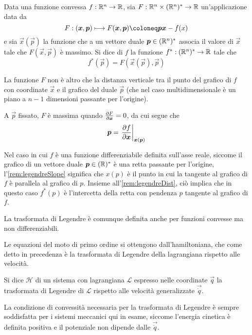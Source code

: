 \begin{definition}
  Data una funzione convessa $f:\mathbb{R}^{n}\to \mathbb{R}$, sia $F: \mathbb{R}^{n} \times (\mathbb{R}^{n})^* \to \mathbb{R}$ un'applicazione data da 
  \begin{equation}
    F: (\vec{x},\vec{p}) \longmapsto  F(\vec{x},\vec{p}) \defeq \vec{p}\vec{x} - f(x)
  \end{equation} 
  e sia $\vec{x}(\vec{p})$ la funzione che a un vettore duale $\boldsymbol{p} \in (\mathbb{R}^{n})^*$ associa il valore di $\vec{x}$ tale che $F(\vec{x},\vec{p})$ è massimo. Si dice  di $f$ la funzione $f^*:(\mathbb{R}^{n})^* \to \mathbb{R}$ tale che \begin{equation}
  f^*(\vec{p}) = F(\vec{x}(\vec{p}), \vec{p})
  \end{equation} 
\end{definition}
\begin{remark} \label{rem:legendreDist}
  La funzione $F$ non è altro che la distanza verticale tra il punto del grafico di $f$ con coordinate $\vec{x}$ e il grafico del duale $\vec{p}$ (che nel caso multidimensionale è un piano a $n-1$ dimensioni passante per l'origine). 
\end{remark}
\begin{remark} \label{rem:legendreSlope}
  A $\vec{p}$ fissato, $F$ è massima quando $\pdv{F}{\boldsymbol{x}}=0$, da cui segue che \begin{equation}
    \vec{p}=\eval{\pdv{f}{\vec{x}}}_{\vec{x}(\vec{p})}
  \end{equation}
\end{remark}
\begin{remark}
  Nel caso in cui $f$ è una funzione differenziabile definita sull'asse reale, siccome il grafico di un vettore duale $\boldsymbol{p} \in  (\mathbb{R})^*$ è una retta passante per l'origine, l'\autoref{rem:legendreSlope} significa che $x(p)$ è il punto in cui la tangente al grafico di $f$ è parallela al grafico di $p$. Insieme all'\autoref{rem:legendreDist}, ciò implica che in questo caso $f^*(p)$ è l'intercetta della retta con pendenza $p$ tangente al grafico di $f$.
\end{remark}
\begin{remark}
  La trasformata di Legendre è comunque definita anche per funzioni convesse ma non differenziabili.
\end{remark}

Le equazioni del moto di primo ordine si ottengono dall'hamiltoniana, che come detto in precedenza è la trasformata di Legendre della lagrangiana rispetto alle velocità.
\begin{definition}
  Si dice  $\mathcal{H}$ di un sistema con lagrangiana $\mathcal{L}$ espresso nelle coordinate $\vec{q}$ la trasformata di Legendre di $\mathcal{L}$ rispetto alle velocità generalizzate $\vec{\dot{q}}$. 
\end{definition}
\begin{remark}
  La condizione di convessità necessaria per la trasformata di Legendre è sempre soddisfatta per i sistemi meccanici qui in esame, siccome l'energia cinetica è definita positiva e il potenziale non dipende dalle $\vec{\dot{q}}$.
\end{remark}

